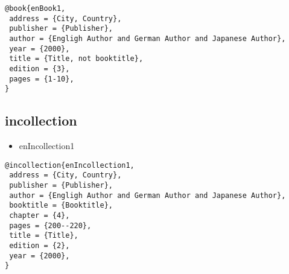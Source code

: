 \documentclass[9pt, twocolumn, a4paper]{jsarticle}
\begin{document}
\begin{bibunit}[jIEEEtran]
\begin{lstlisting}
@book{enBook1,
 address = {City, Country},
 publisher = {Publisher},
 author = {Engligh Author and German Author and Japanese Author},
 year = {2000},
 title = {Title, not booktitle},
 edition = {3},
 pages = {1-10},
}
\end{lstlisting}

\subsection{incollection}

\begin{itemize}
  \item enIncollection1 \cite{enIncollection1}
\end{itemize}

\begin{lstlisting}
@incollection{enIncollection1,
 address = {City, Country},
 publisher = {Publisher},
 author = {Engligh Author and German Author and Japanese Author},
 booktitle = {Booktitle},
 chapter = {4},
 pages = {200--220},
 title = {Title},
 edition = {2},
 year = {2000},
}
\end{lstlisting}

{\footnotesize \putbib[samplebib]}
\end{bibunit}

\clearpage
\end{document}
